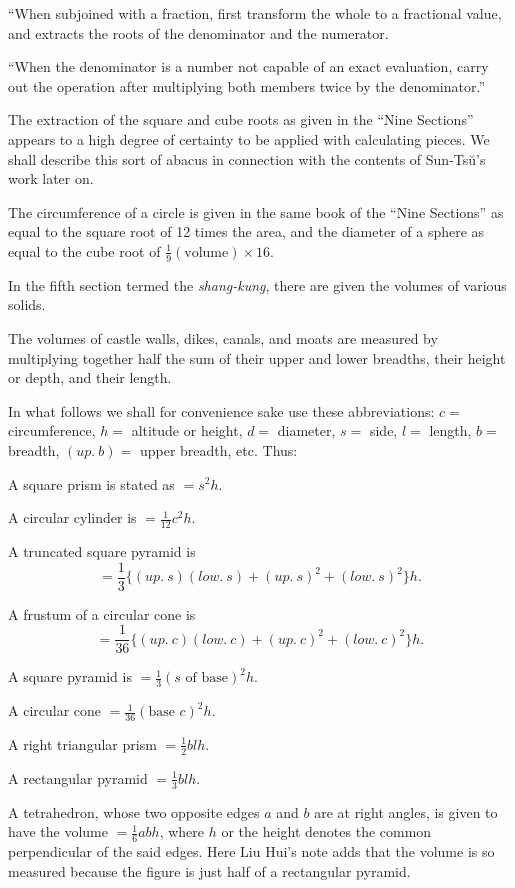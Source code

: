 \documentclass[11pt]{article}
\newcommand{\scanpage}[2]{\clearpage\setcounter{footnote}{0}\noindent{\footnotesize\color{gray}PDF page #1 · #2}\par\medskip}
\newcommand{\scanfooter}{}
\begin{document}
``When subjoined with a fraction, first transform the whole to a fractional value, and extracts the roots of the denominator and the numerator.

``When the denominator is a number not capable of an exact evaluation, carry out the operation after multiplying both members twice by the denominator.''

The extraction of the square and cube roots as given in the ``Nine Sections'' appears to a high degree of certainty to be applied with calculating pieces. We shall describe this sort of abacus in connection with the contents of Sun-Tsŭ's work later on.

The circumference of a circle is given in the same book of the ``Nine Sections'' as equal to the square root of 12 times the area, and the diameter of a sphere as equal to the cube root of $\frac19(\text{volume})\times 16$.
\scanfooter

\scanpage{0029}{Chapter 3, printed page 15}
In the fifth section termed the \emph{shang-kung}, there are given the volumes of various solids.

The volumes of castle walls, dikes, canals, and moats are measured by multiplying together half the sum of their upper and lower breadths, their height or depth, and their length.

In what follows we shall for convenience sake use these abbreviations: $c=$ circumference, $h=$ altitude or height, $d=$ diameter, $s=$ side, $l=$ length, $b=$ breadth, $(up.\ b)=$ upper breadth, etc. Thus:

A square prism is stated as $=s^2h$.

A circular cylinder is $=\frac1{12}c^2h$.

A truncated square pyramid is
\[
=\frac13\{(up.\ s)(low.\ s)+(up.\ s)^2+(low.\ s)^2\}h.
\]

A frustum of a circular cone is
\[
=\frac1{36}\{(up.\ c)(low.\ c)+(up.\ c)^2+(low.\ c)^2\}h.
\]

A square pyramid is $=\frac13(s\text{ of base})^2h$.

A circular cone $=\frac1{36}(\text{base }c)^2h$.

A right triangular prism $=\frac12 blh$.

A rectangular pyramid $=\frac13 blh$.

A tetrahedron, whose two opposite edges $a$ and $b$ are at right angles, is given to have the volume $=\frac16abh$, where $h$ or the height denotes the common perpendicular of the said edges. Here Liu Hui's note adds that the volume is so measured because the figure is just half of a rectangular pyramid.
\end{document}
